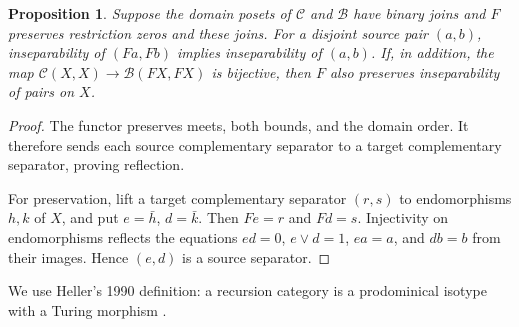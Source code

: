 \documentclass[11pt]{article}
\newtheorem{proposition}[theorem]{Proposition}
\begin{document}
\begin{proposition}\label{prop:reflection}
Suppose the domain posets of $\mathscr C$ and $\mathscr B$ have
binary joins and $F$ preserves restriction zeros and these joins.
For a disjoint source pair $(a,b)$, inseparability of $(Fa,Fb)$
implies inseparability of $(a,b)$.
If, in addition, the map
$\mathscr C(X,X)\to\mathscr B(FX,FX)$ is bijective, then $F$
also preserves inseparability of pairs on $X$.
\end{proposition}
\begin{proof}
The functor preserves meets, both bounds, and the domain order.
It therefore sends each source complementary separator to a target
complementary separator, proving reflection.

For preservation, lift a target complementary separator $(r,s)$ to
endomorphisms $h,k$ of $X$, and put $e=\bar h$, $d=\bar k$.
Then $Fe=r$ and $Fd=s$. Injectivity on endomorphisms reflects the
equations $ed=0$, $e\vee d=1$, $ea=a$, and $db=b$ from their
images. Hence $(e,d)$ is a source separator.
\end{proof}

We use Heller's 1990 definition: a recursion category is a
prodominical isotype with a Turing morphism
\cite[\S9, pp.~1264--1265]{Heller}.
\end{document}

